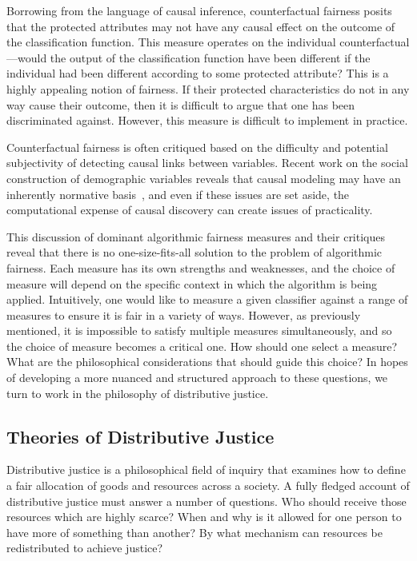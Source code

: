 Borrowing from the language of causal inference, counterfactual fairness posits
that the protected attributes may not have any causal effect on the outcome of
the classification function. This measure operates on the individual
counterfactual—would the output of the classification function have been 
different if the individual had been different according to some protected
attribute? This is a highly appealing notion of fairness.
If their protected characteristics do not in any way cause their outcome, then
it is difficult to argue that one has been discriminated against. However,
this measure is difficult to implement in practice.

Counterfactual fairness is often critiqued based on the difficulty and potential
subjectivity of detecting causal links between variables. Recent work on the 
social construction of demographic variables reveals that causal modeling may 
have an inherently normative basis~\citep{Hu_Forthcoming}, and even if these
issues are set aside, the computational expense of causal discovery can create
issues of practicality.

This discussion of dominant algorithmic fairness measures and their critiques
reveal that there is no one-size-fits-all solution to the problem of algorithmic
fairness. Each measure has its own strengths and weaknesses, and the choice of
measure will depend on the specific context in which the algorithm is being
applied. Intuitively, one would like to measure a given classifier against a
range of measures to ensure it is fair in a variety of ways. However, as
previously mentioned, it is impossible to satisfy multiple measures
simultaneously, and so the choice of measure becomes a critical one.
How should one select a measure? What are the philosophical
considerations that should guide this choice? In hopes of developing a more
nuanced and structured approach to these questions, we turn to work in the 
philosophy of distributive justice.

\subsection{Theories of Distributive Justice}

Distributive justice is a philosophical field of inquiry that examines how to
define a fair allocation of goods and resources across a society. A fully
fledged account of distributive justice must answer a number of questions. Who
should receive those resources which are highly scarce? When and why is it 
allowed for one person to have more of something than another? By what mechanism
can resources be redistributed to achieve justice?

